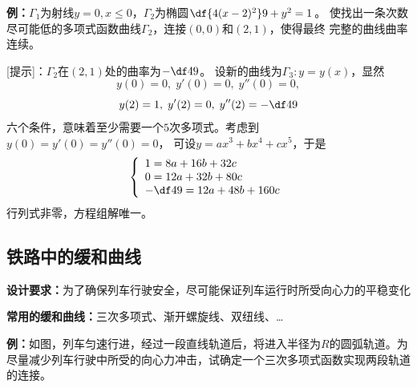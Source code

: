 {\bf 例：}$\Gamma_1$为射线$y=0,x\leq0$，$\Gamma_2$为椭圆$\df{4(x-2)^2}9+y^2=1$。
使找出一条次数尽可能低的多项式函数曲线$\Gamma_2$，连接$(0,0)$和$(2,1)$，使得最终
完整的曲线曲率连续。

[提示]：$\Gamma_2$在$(2,1)$处的曲率为$-\df49$。
设新的曲线为$\Gamma_3:y=y(x)$，显然
$$y(0)=0,\;y'(0)=0,\;y''(0)=0,$$
$$y(2)=1,\;y'(2)=0,\;y''(2)=-\df49$$
六个条件，意味着至少需要一个$5$次多项式。考虑到$y(0)=y'(0)=y''(0)=0$，
可设$y=ax^3+bx^4+cx^5$，于是
$$
\left\{
\begin{array}{l}
1=8a+16b+32c\\
0=12a+32b+80c\\
-\df49=12a+48b+160c
\end{array}
\right.
$$
行列式非零，方程组解唯一。

\subsection{铁路中的缓和曲线}

\begin{center}
\end{center}

{\bf 设计要求：}为了确保列车行驶安全，尽可能保证列车运行时所受向心力的平稳变化

{\bf 常用的缓和曲线：}三次多项式、渐开螺旋线、双纽线、\ldots

{\bf 例：}如图，列车匀速行进，经过一段直线轨道后，将进入半径为$R$的圆弧轨道。为
尽量减少列车行驶中所受的向心力冲击，试确定一个三次多项式函数实现两段轨道的连接。

